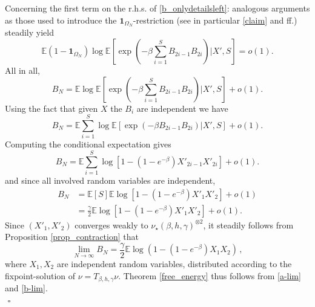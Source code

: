 \documentclass[a4paper,12pt,oneside,reqno]{amsart}
\numberwithin{equation}{section}
\begin{document}
Concerning the first term on the r.h.s. of \eqref{b_onlydetailsleft}: analogous arguments as those used to introduce the $\boldsymbol 1_{\Omega_N}$-restriction (see in particular \eqref{claim} and ff.) steadily
yield
\begin{equation}
{{\mathbb{E}}} (1-\boldsymbol{1}_{\Omega_N}) \log {{\mathbb{E}}}\left[ \exp\left( -  {\beta} \sum\limits_{i=1}^S B_{2i-1} B_{2i} \right)|X',S \right] = o(1).
\end{equation}
All in all,  
\begin{equation}
B_N = {{\mathbb{E}}} \log {{\mathbb{E}}}\left[ \exp\left( -  {\beta} \sum\limits_{i=1}^S B_{2i-1} B_{2i} \right)|X',S \right] +o(1).
\end{equation}
Using the fact that given $X$ the $B_i$ are independent we have
\begin{equation}
B_N = {{\mathbb{E}}} \sum\limits_{i=1}^S\log {{\mathbb{E}}}\left[\exp\left( - {\beta}    B_{2i-1} B_{2i} \right) |X',S\right] +o(1).
\end{equation}
Computing the conditional expectation gives 
\begin{equation}
B_N = {{\mathbb{E}}} \sum\limits_{i=1}^S\log \left[1-(1-e^{-\beta})X'_{2i-1}X'_{2i} \right]  +o(1).
\end{equation}
and since all involved random variables are independent, 
\begin{equation} \begin{aligned}
B_N &= {{\mathbb{E}}}[S] {{\mathbb{E}}} \log \left[1-(1-e^{-\beta})X'_{1}X'_{2} \right]  +o(1) \\
& = \frac{\gamma}{2} {{\mathbb{E}}} \log \left[1-(1-e^{-\beta})X'_{1}X'_{2} \right] + o(1).
\end{aligned} \end{equation}
Since $(X'_1,X'_2)$ converges weakly to $\nu_\star({\beta},h,\gamma)^{\otimes 2}$, it steadily follows from Proposition \ref{prop_contraction} that
\begin{equation} \label{b-lim}
\lim_{N\to \infty} B_N = \frac{\gamma}{2} {{\mathbb{E}}}\log\left( 1-\left(1-e^{-{\beta}} \right) X_1 X_2 \right)\,,
\end{equation}
where $X_1, X_2$ are independent random variables, distributed according to the fixpoint-solution of $\nu = T_{{\beta}, h, \gamma}\nu$. Theorem \ref{free_energy} thus follows from \eqref{a-lim} and \eqref{b-lim}. \\
${}$ \hfill $\square$
\end{document}

